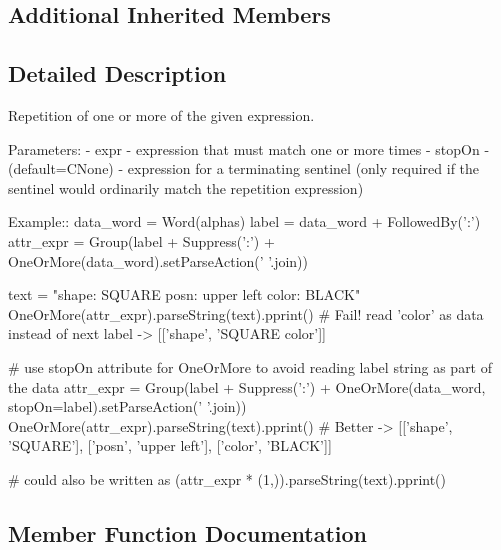 \subsection*{Additional Inherited Members}


\subsection{Detailed Description}
\begin{DoxyVerb}Repetition of one or more of the given expression.

Parameters:
 - expr - expression that must match one or more times
 - stopOn - (default=C{None}) - expression for a terminating sentinel
      (only required if the sentinel would ordinarily match the repetition 
      expression)          

Example::
    data_word = Word(alphas)
    label = data_word + FollowedBy(':')
    attr_expr = Group(label + Suppress(':') + OneOrMore(data_word).setParseAction(' '.join))

    text = "shape: SQUARE posn: upper left color: BLACK"
    OneOrMore(attr_expr).parseString(text).pprint()  # Fail! read 'color' as data instead of next label -> [['shape', 'SQUARE color']]

    # use stopOn attribute for OneOrMore to avoid reading label string as part of the data
    attr_expr = Group(label + Suppress(':') + OneOrMore(data_word, stopOn=label).setParseAction(' '.join))
    OneOrMore(attr_expr).parseString(text).pprint() # Better -> [['shape', 'SQUARE'], ['posn', 'upper left'], ['color', 'BLACK']]
    
    # could also be written as
    (attr_expr * (1,)).parseString(text).pprint()
\end{DoxyVerb}
 

\subsection{Member Function Documentation}
\mbox{\label{classsetuptools_1_1__vendor_1_1pyparsing_1_1OneOrMore_a0ae3a5700eda959018801f21bc695aa2}} 
